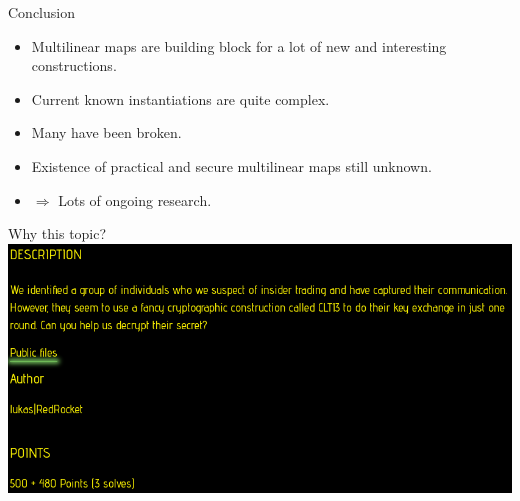 \documentclass[english]{beamer}
\begin{document}
    \begin{frame}{Conclusion}
        \begin{itemize}
            \item Multilinear maps are building block for a lot of new and interesting constructions.
            \item Current known instantiations are quite complex.
            \item Many have been broken.
            \item Existence of practical and secure multilinear maps still unknown.
            \item $\Rightarrow$ Lots of ongoing research.
        \end{itemize}
    \end{frame}
    \begin{frame}{Why this topic?}
        \includegraphics[width=\linewidth]{img/chall_desc.png}
    \end{frame}
\end{document}
